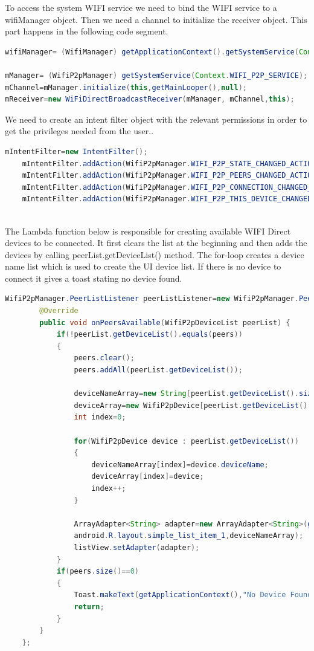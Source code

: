To access the system WIFI service we need to bind the WIFI service to a wifiManager object. Then we need a channel to initialize the receiver object. This part happens in the following code segment.

\begin{lstlisting}[language=Java]
wifiManager= (WifiManager) getApplicationContext().getSystemService(Context.WIFI_SERVICE);

mManager= (WifiP2pManager) getSystemService(Context.WIFI_P2P_SERVICE);
mChannel=mManager.initialize(this,getMainLooper(),null);	
mReceiver=new WiFiDirectBroadcastReceiver(mManager, mChannel,this);
\end{lstlisting}
We need to create an intent filter object with the relevant permissions in order to get the privileges needed from the user..
\begin{lstlisting}[language=Java]
    mIntentFilter=new IntentFilter();
    mIntentFilter.addAction(WifiP2pManager.WIFI_P2P_STATE_CHANGED_ACTION);
    mIntentFilter.addAction(WifiP2pManager.WIFI_P2P_PEERS_CHANGED_ACTION);
    mIntentFilter.addAction(WifiP2pManager.WIFI_P2P_CONNECTION_CHANGED_ACTION);
    mIntentFilter.addAction(WifiP2pManager.WIFI_P2P_THIS_DEVICE_CHANGED_ACTION);
	
\end{lstlisting}

The Lambda function below is responsible for creating available WIFI Direct devices to be connected. It first clears the list at the beginning and then adds the devices by calling peerList.getDeviceList() method. The for-loop creates a device name list which is used to create the UI device list. If there is no device to connect it gives a toast stating no device found.  

\begin{lstlisting}[language=Java]
    WifiP2pManager.PeerListListener peerListListener=new WifiP2pManager.PeerListListener() {
        @Override
        public void onPeersAvailable(WifiP2pDeviceList peerList) {
            if(!peerList.getDeviceList().equals(peers))
            {
                peers.clear();
                peers.addAll(peerList.getDeviceList());

                deviceNameArray=new String[peerList.getDeviceList().size()];
                deviceArray=new WifiP2pDevice[peerList.getDeviceList().size()];
                int index=0;

                for(WifiP2pDevice device : peerList.getDeviceList())
                {
                    deviceNameArray[index]=device.deviceName;
                    deviceArray[index]=device;
                    index++;
                }

                ArrayAdapter<String> adapter=new ArrayAdapter<String>(getApplicationContext(),
                android.R.layout.simple_list_item_1,deviceNameArray);
                listView.setAdapter(adapter);
            }
            if(peers.size()==0)
            {
                Toast.makeText(getApplicationContext(),"No Device Found",Toast.LENGTH_SHORT).show();
                return;
            }
        }
    };
	
\end{lstlisting}

